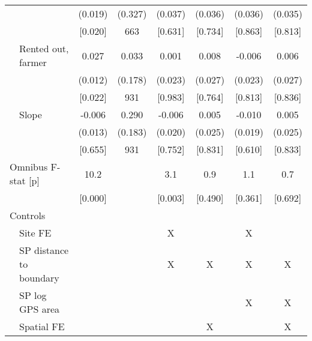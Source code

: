 \begin{tabular}{llcccccc}
 & & (0.019) & (0.327) & (0.037) & (0.036) & (0.036) & (0.035) \\
 & & [0.020] & 663 & [0.631] & [0.734] & [0.863] & [0.813] \\[0.5em]
 & Rented out, farmer & 0.027 & 0.033 & 0.001 & 0.008 & -0.006 & 0.006 \\
 & & (0.012) & (0.178) & (0.023) & (0.027) & (0.023) & (0.027) \\
 & & [0.022] & 931 & [0.983] & [0.764] & [0.813] & [0.836] \\[0.5em]
 & Slope & -0.006 & 0.290 & -0.006 & 0.005 & -0.010 & 0.005 \\
 & & (0.013) & (0.183) & (0.020) & (0.025) & (0.019) & (0.025) \\
 & & [0.655] & 931 & [0.752] & [0.831] & [0.610] & [0.833] \\[0.5em]
\multicolumn{2}{l}{Omnibus F-stat [p]} & 10.2 &  & 3.1 & 0.9 & 1.1 & 0.7 \\
&  & [0.000] &  & [0.003] & [0.490] & [0.361] & [0.692] \\[0.5em]
\hline
\multicolumn{2}{l}{Controls} & & & & & & \\
\cmidrule(lr){1-2}
 & Site FE &  &  & X &  & X &  \\
 & SP distance to boundary &  &  & X & X & X & X \\
 & SP log GPS area &  &  &  &  & X & X \\
 & Spatial FE &  &  &  & X &  & X \\
\hline
\end{tabular}
